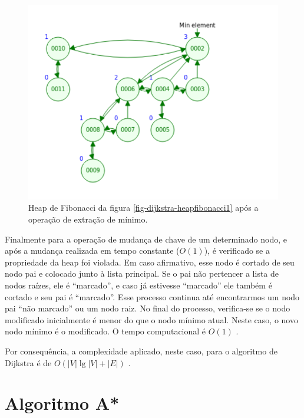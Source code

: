 
\begin{figure}[H]
\centering
\includegraphics[width=.54\textwidth]{figuras/fibonacci-heap2} 
\caption{Heap de Fibonacci da figura \ref{fig-dijkstra-heapfibonacci1} após a operação de extração de mínimo.}
\label{fig-dijkstra-heapfibonacci2}
\end{figure}


Finalmente para a operação de mudança de chave de um determinado nodo, e após a mudança realizada em tempo constante ($O(1)$), é verificado se a propriedade da heap foi violada. Em caso afirmativo, esse nodo é cortado de seu nodo pai e colocado junto à lista principal. Se o pai não pertencer a lista de nodos raízes, ele é ``marcado'', e caso já estivesse ``marcado'' ele também é cortado e seu pai é ``marcado''. Esse processo continua até encontrarmos um nodo pai ``não marcado'' ou um nodo raiz. No final do processo, verifica-se se o nodo modificado inicialmente é menor do que o nodo mínimo atual. Neste caso, o novo nodo mínimo é o modificado. O tempo computacional é $O(1)$ \cite{cormen2009introduction}.

Por consequência, a complexidade aplicado, neste caso, para o algoritmo de Dijkstra é de $O(|V|\lg |V| + |E|)$ \cite{cormen2009introduction}.

\section{Algoritmo A*}
\label{sec-aestrela}


